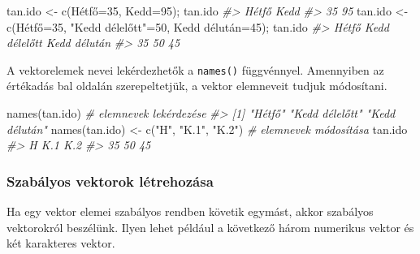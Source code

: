 \documentclass[
]{book}
\newenvironment{Shaded}{\begin{snugshade}}{\end{snugshade}}
\newcommand{\AttributeTok}[1]{\textcolor[rgb]{0.77,0.63,0.00}{#1}}
\newcommand{\CommentTok}[1]{\textcolor[rgb]{0.56,0.35,0.01}{\textit{#1}}}
\newcommand{\DecValTok}[1]{\textcolor[rgb]{0.00,0.00,0.81}{#1}}
\newcommand{\FunctionTok}[1]{\textcolor[rgb]{0.00,0.00,0.00}{#1}}
\newcommand{\NormalTok}[1]{#1}
\newcommand{\OtherTok}[1]{\textcolor[rgb]{0.56,0.35,0.01}{#1}}
\newcommand{\StringTok}[1]{\textcolor[rgb]{0.31,0.60,0.02}{#1}}
\begin{document}
\begin{Shaded}
\begin{Highlighting}[]
\NormalTok{tan.ido }\OtherTok{\textless{}{-}} \FunctionTok{c}\NormalTok{(Hétfő}\OtherTok{=}\DecValTok{35}\NormalTok{, }\AttributeTok{Kedd=}\DecValTok{95}\NormalTok{); tan.ido}
\CommentTok{\#\textgreater{} Hétfő  Kedd }
\CommentTok{\#\textgreater{}    35    95}
\NormalTok{tan.ido }\OtherTok{\textless{}{-}} \FunctionTok{c}\NormalTok{(Hétfő}\OtherTok{=}\DecValTok{35}\NormalTok{, }\StringTok{"Kedd délelőtt"}\OtherTok{=}\DecValTok{50}\NormalTok{, }\StringTok{\textasciigrave{}}\AttributeTok{Kedd délután}\StringTok{\textasciigrave{}}\OtherTok{=}\DecValTok{45}\NormalTok{); tan.ido}
\CommentTok{\#\textgreater{}         Hétfő Kedd délelőtt  Kedd délután }
\CommentTok{\#\textgreater{}            35            50            45}
\end{Highlighting}
\end{Shaded}

A vektorelemek nevei lekérdezhetők a \texttt{names()} függvénnyel. Amennyiben az értékadás bal oldalán szerepeltetjük, a vektor elemneveit tudjuk módosítani.

\begin{Shaded}
\begin{Highlighting}[]
\FunctionTok{names}\NormalTok{(tan.ido)                         }\CommentTok{\# elemnevek lekérdezése}
\CommentTok{\#\textgreater{} [1] "Hétfő"         "Kedd délelőtt" "Kedd délután"}
\FunctionTok{names}\NormalTok{(tan.ido) }\OtherTok{\textless{}{-}} \FunctionTok{c}\NormalTok{(}\StringTok{"H"}\NormalTok{, }\StringTok{"K.1"}\NormalTok{, }\StringTok{"K.2"}\NormalTok{) }\CommentTok{\# elemnevek módosítása}
\NormalTok{tan.ido}
\CommentTok{\#\textgreater{}   H K.1 K.2 }
\CommentTok{\#\textgreater{}  35  50  45}
\end{Highlighting}
\end{Shaded}

\hypertarget{szabalyosvektorokalfejezet}{%
\subsubsection{Szabályos vektorok létrehozása}\label{szabalyosvektorokalfejezet}}

Ha egy vektor elemei szabályos rendben követik egymást, akkor szabályos vektorokról beszélünk. Ilyen lehet például a következő három numerikus vektor és két karakteres vektor.
\end{document}
